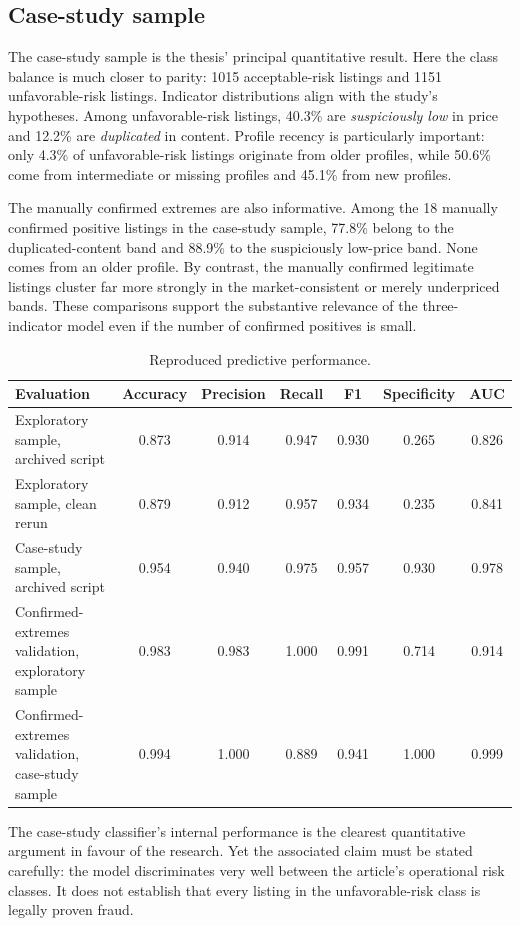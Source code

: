 \documentclass[11pt,a4paper]{article}
\begin{document}
\subsection{Case-study sample}
The case-study sample is the thesis' principal quantitative result. Here the class balance is much closer to parity: 1015 acceptable-risk listings and 1151 unfavorable-risk listings. Indicator distributions align with the study's hypotheses. Among unfavorable-risk listings, 40.3\% are \emph{suspiciously low} in price and 12.2\% are \emph{duplicated} in content. Profile recency is particularly important: only 4.3\% of unfavorable-risk listings originate from older profiles, while 50.6\% come from intermediate or missing profiles and 45.1\% from new profiles.

The manually confirmed extremes are also informative. Among the 18 manually confirmed positive listings in the case-study sample, 77.8\% belong to the duplicated-content band and 88.9\% to the suspiciously low-price band. None comes from an older profile. By contrast, the manually confirmed legitimate listings cluster far more strongly in the market-consistent or merely underpriced bands. These comparisons support the substantive relevance of the three-indicator model even if the number of confirmed positives is small.

\begin{table}[H]
\centering
\caption{Reproduced predictive performance.}
\begin{tabularx}{\textwidth}{p{4.8cm} c c c c c c}
\toprule
\textbf{Evaluation} & \textbf{Accuracy} & \textbf{Precision} & \textbf{Recall} & \textbf{F1} & \textbf{Specificity} & \textbf{AUC} \\
\midrule
Exploratory sample, archived script & 0.873 & 0.914 & 0.947 & 0.930 & 0.265 & 0.826 \\
Exploratory sample, clean rerun & 0.879 & 0.912 & 0.957 & 0.934 & 0.235 & 0.841 \\
Case-study sample, archived script & 0.954 & 0.940 & 0.975 & 0.957 & 0.930 & 0.978 \\
Confirmed-extremes validation, exploratory sample & 0.983 & 0.983 & 1.000 & 0.991 & 0.714 & 0.914 \\
Confirmed-extremes validation, case-study sample & 0.994 & 1.000 & 0.889 & 0.941 & 1.000 & 0.999 \\
\bottomrule
\end{tabularx}
\end{table}

The case-study classifier's internal performance is the clearest quantitative argument in favour of the research. Yet the associated claim must be stated carefully: the model discriminates very well between the article's operational risk classes. It does not establish that every listing in the unfavorable-risk class is legally proven fraud.
\end{document}
